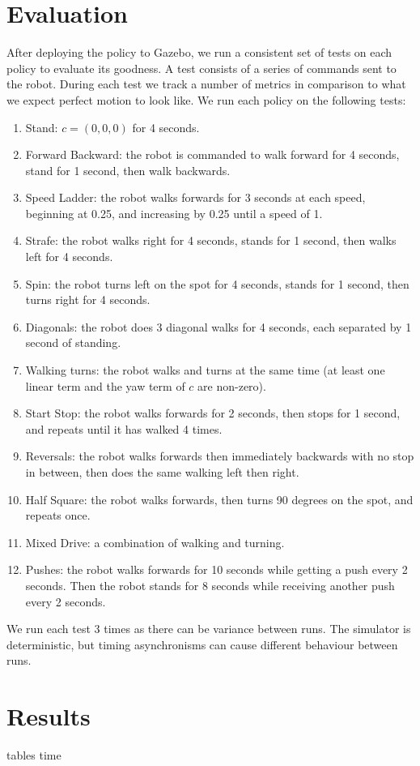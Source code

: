\documentclass[11pt]{article}
\begin{document}
\section{Evaluation}
After deploying the policy to Gazebo, we run a consistent set of tests on each policy to evaluate its goodness. A test consists of a series of commands sent to the robot. During each test we track a number of metrics in comparison to what we expect perfect motion to look like. We run each policy on the following tests:
\begin{enumerate}
    \item Stand: $c=(0,0,0)$ for 4 seconds.
    \item Forward Backward: the robot is commanded to walk forward for 4 seconds, stand for 1 second, then walk backwards.
    \item Speed Ladder: the robot walks forwards for 3 seconds at each speed, beginning at 0.25, and increasing by 0.25 until a speed of 1.
    \item Strafe: the robot walks right for 4 seconds, stands for 1 second, then walks left for 4 seconds.
    \item Spin: the robot turns left on the spot for 4 seconds, stands for 1 second, then turns right for 4 seconds.
    \item Diagonals: the robot does 3 diagonal walks for 4 seconds, each separated by 1 second of standing.
    \item Walking turns: the robot walks and turns at the same time (at least one linear term and the yaw term of $c$ are non-zero).
    \item Start Stop: the robot walks forwards for 2 seconds, then stops for 1 second, and repeats until it has walked 4 times.
    \item Reversals: the robot walks forwards then immediately backwards with no stop in between, then does the same walking left then right.
    \item Half Square: the robot walks forwards, then turns 90 degrees on the spot, and repeats once.
    \item Mixed Drive: a combination of walking and turning.
    \item Pushes: the robot walks forwards for 10 seconds while getting a push every 2 seconds. Then the robot stands for 8 seconds while receiving another push every 2 seconds.
\end{enumerate}
We run each test 3 times as there can be variance between runs. The simulator is deterministic, but timing asynchronisms can cause different behaviour between runs.
\section{Results}
tables time
\end{document}
